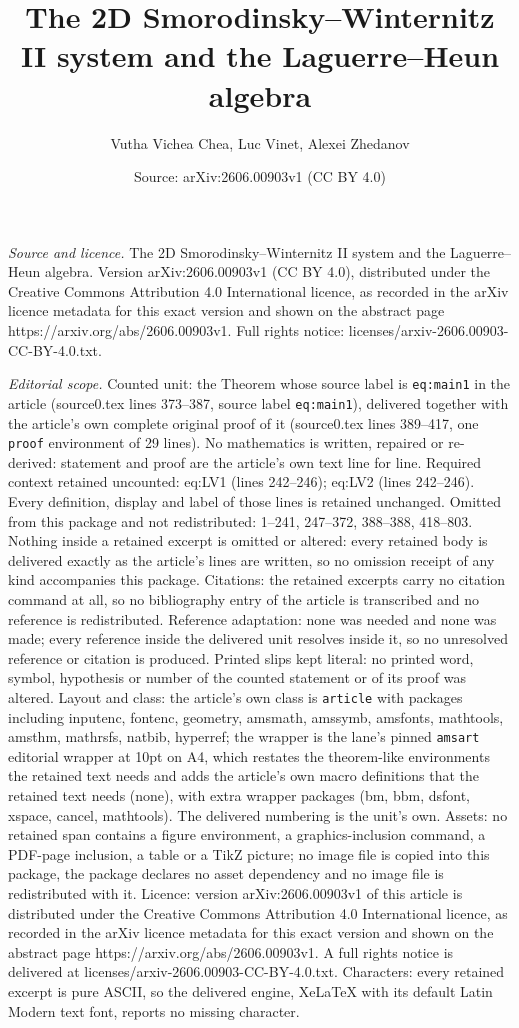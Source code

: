 \documentclass[10pt,a4paper]{amsart}
\title[The 2D Smorodinsky--Winternitz II system and the Laguerre--H]{The 2D Smorodinsky--Winternitz II system and the Laguerre--Heun algebra}
\author{Vutha Vichea Chea, Luc Vinet, Alexei Zhedanov}
\date{Source: arXiv:2606.00903v1 (CC BY 4.0)}
\begin{document}
\maketitle

\noindent\emph{Source and licence.} The 2D Smorodinsky--Winternitz II system and the Laguerre--Heun algebra. Version arXiv:2606.00903v1 (CC BY 4.0), distributed under the Creative Commons Attribution 4.0 International licence, as recorded in the arXiv licence metadata for this exact version and shown on the abstract page https://arxiv.org/abs/2606.00903v1. Full rights notice: licenses/arxiv-2606.00903-CC-BY-4.0.txt.\par\smallskip

\noindent\textit{Editorial scope.} Counted unit: the Theorem whose source label is \texttt{eq:main1} in the article (source0.tex lines 373--387, source label \texttt{eq:main1}), delivered together with the article's own complete original proof of it (source0.tex lines 389--417, one \texttt{proof} environment of 29 lines). No mathematics is written, repaired or re-derived: statement and proof are the article's own text line for line. Required context retained uncounted: eq:LV1 (lines 242--246); eq:LV2 (lines 242--246). Every definition, display and label of those lines is retained unchanged. Omitted from this package and not redistributed: 1--241, 247--372, 388--388, 418--803. Nothing inside a retained excerpt is omitted or altered: every retained body is delivered exactly as the article's lines are written, so no omission receipt of any kind accompanies this package. Citations: the retained excerpts carry no citation command at all, so no bibliography entry of the article is transcribed and no reference is redistributed. Reference adaptation: none was needed and none was made; every reference inside the delivered unit resolves inside it, so no unresolved reference or citation is produced. Printed slips kept literal: no printed word, symbol, hypothesis or number of the counted statement or of its proof was altered. Layout and class: the article's own class is \texttt{article} with packages including inputenc, fontenc, geometry, amsmath, amssymb, amsfonts, mathtools, amsthm, mathrsfs, natbib, hyperref; the wrapper is the lane's pinned \texttt{amsart} editorial wrapper at 10pt on A4, which restates the theorem-like environments the retained text needs and adds the article's own macro definitions that the retained text needs (none), with extra wrapper packages (bm, bbm, dsfont, xspace, cancel, mathtools). The delivered numbering is the unit's own. Assets: no retained span contains a figure environment, a graphics-inclusion command, a PDF-page inclusion, a table or a TikZ picture; no image file is copied into this package, the package declares no asset dependency and no image file is redistributed with it. Licence: version arXiv:2606.00903v1 of this article is distributed under the Creative Commons Attribution 4.0 International licence, as recorded in the arXiv licence metadata for this exact version and shown on the abstract page https://arxiv.org/abs/2606.00903v1. A full rights notice is delivered at licenses/arxiv-2606.00903-CC-BY-4.0.txt. Characters: every retained excerpt is pure ASCII, so the delivered engine, XeLaTeX with its default Latin Modern text font, reports no missing character.
\end{document}
